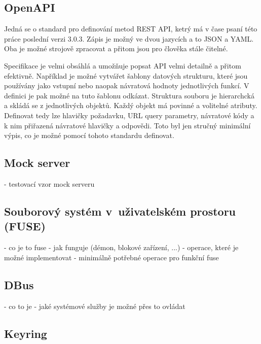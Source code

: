 \subsection{OpenAPI}

Jedná se o standard pro definování metod REST API, ketrý má v čase psaní této práce poslední verzi 3.0.3. Zápis je možný ve dvou jazycích a to JSON a YAML. Oba 
je možné strojově zpracovat a přitom jsou pro člověka stále čitelné. 

Specifikace je velmi obsáhlá a umožňuje popsat API velmi detailně a přitom efektivně. Například je možné vytvářet šablony datových strukturu, které jsou používány jako
vstupní nebo naopak návratová hodnoty jednotlivých funkcí. V definici je pak možné na tuto šablonu odkázat. Struktura souboru je hierarchcká a skládá se z jednotlivých objektů.
Každý objekt má povinné a volitelné atributy. Definovat tedy lze hlavičky požadavku, URL query parametry, návratové kódy a k nim přiřazená návratové hlavičky a odpovědi.
Toto byl jen stručný minimální výpis, co je možné pomocí tohoto standardu definovat.\cite{OpenAPI}

\subsection{Mock server}

- testovací vzor mock serveru

\cite{MockServer}

\subsection{Souborový systém v uživatelském prostoru (FUSE)}
\label{sec:fuse}

- co je to fuse
- jak funguje (démon, blokové zařízení, ...)
- operace, které je možné implementovat
    - minimálně potřebné operace pro funkční fuse

\cite{FuseOrNotToFuse}
\cite{HardeningFUSE}

\subsection{DBus}

- co to je 
- jaké systémové služby je možné přes to ovládat

\subsection{Keyring}

